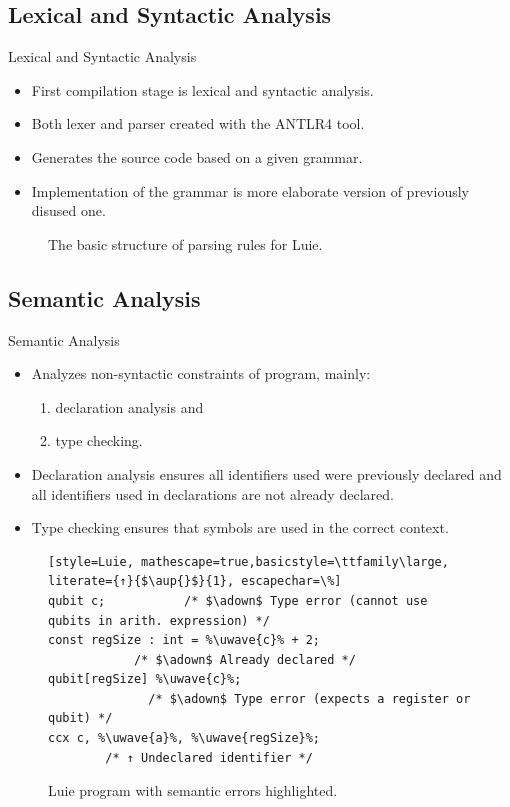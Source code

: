 \subsection{Lexical and Syntactic Analysis}
\begin{frame}{Lexical and Syntactic Analysis}
    \begin{itemize}
        \item First compilation stage is lexical and syntactic analysis.
        \item Both lexer and parser created with the ANTLR4 tool.
        \item Generates the source code based on a given grammar. 
        \item Implementation of the grammar is more elaborate version of previously disused one.
    \end{itemize}
    \vfill
    \begin{figure}[h]
        \centering
        
        \caption{The basic structure of parsing rules for Luie.}
    \end{figure}
\end{frame}

\subsection{Semantic Analysis}
\begin{frame}[fragile]{Semantic Analysis}
    \begin{itemize}
        \item Analyzes non-syntactic constraints of program, mainly:
        \begin{enumerate}
            \item declaration analysis and
            \item type checking.
        \end{enumerate}
        \item Declaration analysis ensures all identifiers used were previously declared and all identifiers used in declarations are not already declared.
        \item Type checking ensures that symbols are used in the correct context.
    \end{itemize}
    \vfill
    \begin{figure}[htp]
        \centering     
        \begin{lstlisting}[style=Luie, mathescape=true,basicstyle=\ttfamily\large, literate={↑}{$\aup{}$}{1}, escapechar=\%] 
qubit c;           /* $\adown$ Type error (cannot use qubits in arith. expression) */       
const regSize : int = %\uwave{c}% + 2; 
            /* $\adown$ Already declared */      
qubit[regSize] %\uwave{c}%;
              /* $\adown$ Type error (expects a register or qubit) */                      
ccx c, %\uwave{a}%, %\uwave{regSize}%;
        /* ↑ Undeclared identifier */                 
        \end{lstlisting}
        \caption{Luie program with semantic errors highlighted.}
    \end{figure}
\end{frame}

